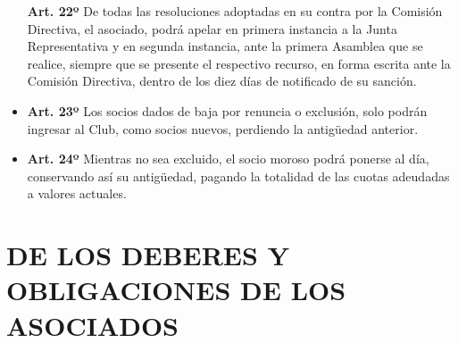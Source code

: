 \documentclass[]{book}
\begin{document}
\begin{itemize}
  \textbf{Art. 22º} De todas las resoluciones adoptadas en su contra por
  la Comisión Directiva, el asociado, podrá apelar en primera instancia
  a la Junta Representativa y en segunda instancia, ante la primera
  Asamblea que se realice, siempre que se presente el respectivo
  recurso, en forma escrita ante la Comisión Directiva, dentro de los
  diez días de notificado de su sanción.
\item
  \textbf{Art. 23º} Los socios dados de baja por renuncia o exclusión,
  solo podrán ingresar al Club, como socios nuevos, perdiendo la
  antigüedad anterior.
\item
  \textbf{Art. 24º} Mientras no sea excluido, el socio moroso podrá
  ponerse al día, conservando así su antigüedad, pagando la totalidad de
  las cuotas adeudadas a valores actuales.
\end{itemize}

\chapter{DE LOS DEBERES Y OBLIGACIONES DE LOS
ASOCIADOS}\label{de-los-deberes-y-obligaciones-de-los-asociados}
\end{document}
